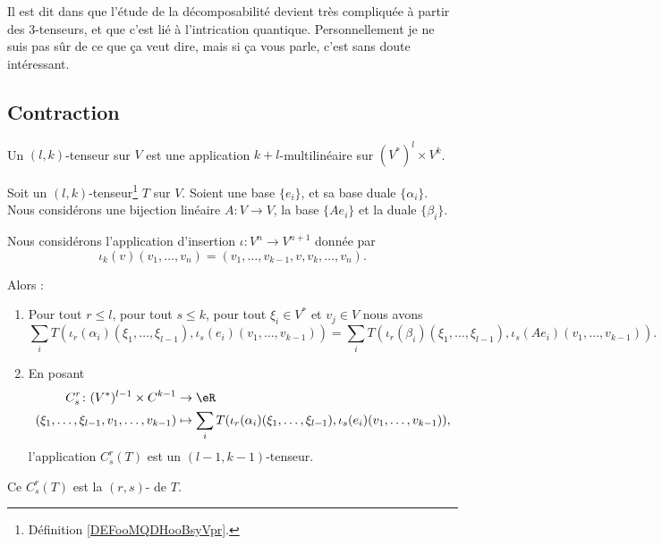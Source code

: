 \begin{normaltext}
	Il est dit dans \cite{BIBooDEEYooRGFyDD} que l'étude de la décomposabilité devient très compliquée à partir des \( 3\)-tenseurs, et que c'est lié à l'intrication quantique. Personnellement je ne suis pas sûr de ce que ça veut dire, mais si ça vous parle, c'est sans doute intéressant.
\end{normaltext}

\subsection{Contraction}

\begin{definition}		\label{DEFooMQDHooBsyVpr}
	Un \( (l,k)\)-tenseur sur \( V\) est une application \( k+l\)-multilinéaire sur \( (V^*)^l\times V^k\).
\end{definition}

\begin{propositionDef}
	Soit un \( (l,k)\)-tenseur\footnote{Définition \ref{DEFooMQDHooBsyVpr}.} \( T\) sur \( V\). Soient une base \( \{ e_i \}\), et sa base duale \( \{ \alpha_i \}\). Nous considérons une bijection linéaire \(A \colon V\to V  \), la base \( \{ Ae_i \}\) et la duale \( \{ \beta_i \}\).

	Nous considérons l'application d'insertion \(\iota \colon V^n\to V^{n+1}  \) donnée par
	\begin{equation}
		\iota_k(v)(v_1,\ldots,v_n)=(v_1,\ldots,v_{k-1},v,v_k,\ldots,v_n).
	\end{equation}

	Alors :
	\begin{enumerate}
		\item
		      Pour tout \( r\leq l\), pour tout \( s\leq k\), pour tout \( \xi_i\in V^*\) et \( v_j\in V\) nous avons
		      \begin{equation}
			      \sum_i T(   \iota_r(\alpha_i)(\xi_1,\ldots,\xi_{l-1}), \iota_s(e_i)(v_1,\ldots,v_{k-1})   )=
			      \sum_i T(   \iota_r(\beta_i)(\xi_1,\ldots,\xi_{l-1}), \iota_s(Ae_i)(v_1,\ldots,v_{k-1})   ).
		      \end{equation}
		\item
		      En posant
		      \begin{equation}
			      \begin{aligned}
				      C_s^r\colon (V^*)^{l-1}\times C^{k-1}       & \to \eR \\
				      (\xi_1,\ldots,\xi_{l-1},v_1,\ldots,v_{k-1}) & \mapsto
				      \sum_i T(   \iota_r(\alpha_i)(\xi_1,\ldots,\xi_{l-1}), \iota_s(e_i)(v_1,\ldots,v_{k-1})   ),
			      \end{aligned}
		      \end{equation}
		      l'application \( C_s^r(T)\) est un \( (l-1, k-1)\)-tenseur.
	\end{enumerate}
	Ce \( C_s^r(T)\) est la \( (r,s)\)- de \( T\).
\end{propositionDef}

